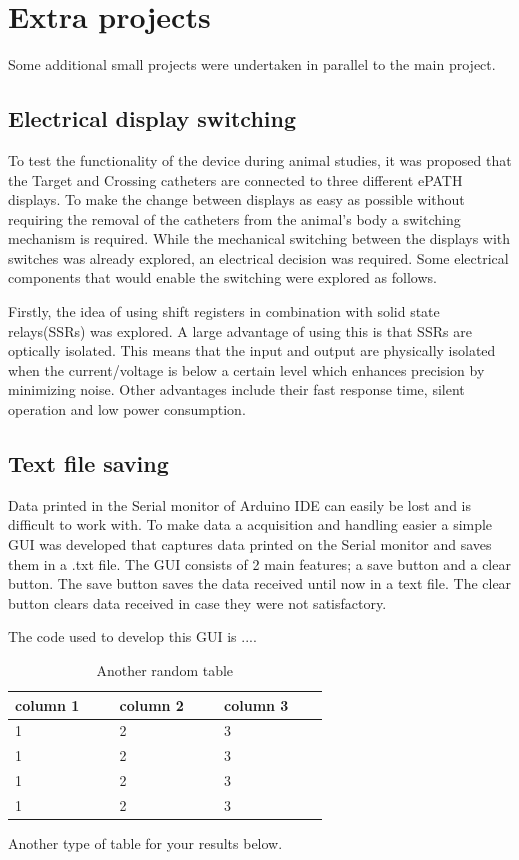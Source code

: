 \section{Extra projects}

Some additional small projects were undertaken in parallel to the main project.

\subsection{Electrical display switching}
To test the functionality of the device during animal studies, it was proposed that the Target and Crossing catheters are connected to three different ePATH displays. To make the change between displays as easy as possible without requiring the removal of the catheters from the animal's body a switching mechanism is required. While the mechanical switching between the displays with switches was already explored, an electrical decision was required. Some electrical components that would enable the switching were explored as follows.

Firstly, the idea of using shift registers in combination with solid state relays(SSRs) was explored. A large advantage of using this is that SSRs are optically isolated. This means that the input and output are physically isolated when the current/voltage is below a certain level which enhances precision by minimizing noise. Other advantages include their fast response time, silent operation and low power consumption. 



\subsection{Text file saving}
Data printed in the Serial monitor of Arduino IDE can easily be lost and is difficult to work with. To make data a acquisition and handling easier a simple GUI was developed that captures data printed on the Serial monitor and saves them in a .txt file. The GUI consists of 2 main features; a save button and a clear button. The save button saves the data received until now in a text file. The clear button clears data received in case they were not satisfactory.

The code used to develop this GUI is ....

\begin{table}[ht]
    \centering
    \begin{tabular}{p{0.25\linewidth}p{0.25\linewidth}p{0.25\linewidth}}
    \hline
    column 1 & column 2 & column 3\\
    \hline
    1 & 2 & 3\\
    1 & 2 & 3\\
    1 & 2 & 3\\
    1 & 2 & 3\\
    \hline
    \end{tabular}
    \caption{Another random table}
    \label{tab:2}
\end{table}
\noindent Another type of table for your results below.


